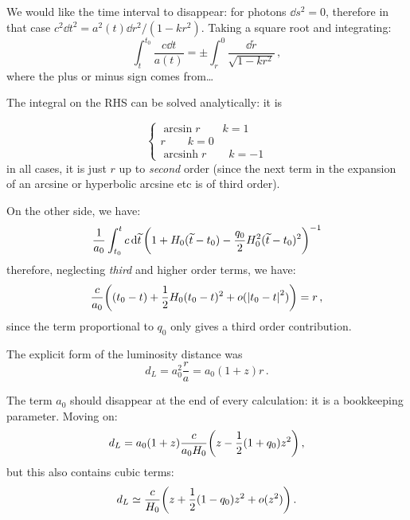 \documentclass[main.tex]{subfiles}
\begin{document}
We would like the time interval to disappear: for photons \(\dd{s^2} =0\), therefore in that case \(c^2 \dd{t^2} = a^2 (t) \dd{r^2} / (1-kr^2) \). Taking a square root and integrating:
\begin{equation}
  \int_{t}^{t_0 } \frac{c \dd{t}}{a(t)}
  = \pm \int_r^0 \frac{\dd{\widetilde{r}}}{\sqrt{1-kr^2}}\,,
\end{equation}
%
where the plus or minus sign comes from\dots

The integral on the RHS can be solved analytically: it is 

\begin{equation}
  \begin{cases}
      \arcsin r \qquad k=1 \\
      r \qquad k=0 \\
      \operatorname{arcsinh} r \qquad k = -1
  \end{cases}
\end{equation}
%
in all cases, it is just \(r\) up to \emph{second} order (since the next term in the expansion of an arcsine or hyperbolic arcsine etc is of third order).

On the other side, we have:
\begin{equation}
  \frac{1}{a_0 }
  \int_{t_0 }^t c\dd{\widetilde{t}} \qty(1 + H_0 (\widetilde{t} - t_0) - \frac{q_0}{2}H_0^2 (\widetilde{t} - t_0)^2)^{-1}
\end{equation}
%
therefore, neglecting \emph{third} and higher order terms, we have:
\begin{equation}
  \frac{c}{a_0 } \qty((t_0 - t) + \frac{1}{2} H_0 (t_0 - t)^2 + o(\abs{t_0 - t} ^2)) = r \,,
\end{equation}
%
since the term proportional to \(q_0 \) only gives a third order contribution.

The explicit form of the luminosity distance was
\begin{equation}
  d_L = a_0^2 \frac{r}{a} = a_0 (1+z) r\,.
\end{equation}

The term \(a_0 \) should disappear at the end of every calculation: it is a bookkeeping parameter.
Moving on:
\begin{equation}
  d_L = a_0 (1+z) \frac{c}{a_0 H_0 } \qty(z - \frac{1}{2} (1+ q_0 )z^2)\,,
\end{equation}
%
but this also contains cubic terms:
\begin{equation}
  d_L \simeq \frac{c}{H_0} \qty(z + \frac{1}{2} (1-q_0 ) z^2 + o(z^2))\,.
\end{equation}
\end{document}
